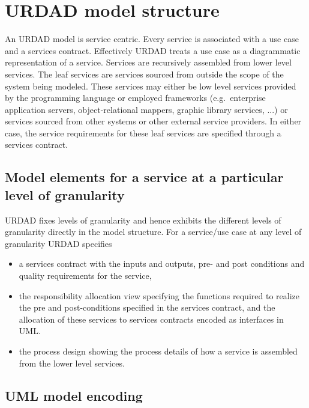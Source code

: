 \section{URDAD model structure}

An URDAD model is service centric. Every service is associated with a use case and a services contract. 
Effectively URDAD treats a use case as a diagrammatic representation of a service. Services are recursively
assembled from lower level services. The leaf services are services sourced from outside the scope of the system
being modeled. These services may either be low level services provided by the programming language or employed
frameworks (e.g.\ enterprise application servers, object-relational mappers, graphic library services, ...) or services
sourced from other systems or other external service providers. In either case, the service requirements for these
leaf services are specified through a services contract.


\subsection{Model elements for a service at a particular level of granularity}

URDAD fixes levels of granularity and hence exhibits the different levels of granularity directly in the model structure.
For a service/use case at any level of granularity URDAD specifies
\begin{itemize}
  \item a services contract with the inputs and outputs, pre- and post conditions and quality requirements for the service,
  \item the responsibility allocation view specifying the functions required to realize the pre and post-conditions 
specified in the services contract, and the allocation of these services to services contracts encoded as interfaces in UML.
  \item the process design showing the process details of how a service is assembled from the lower level services.
\end{itemize}


\subsection{UML model encoding}

